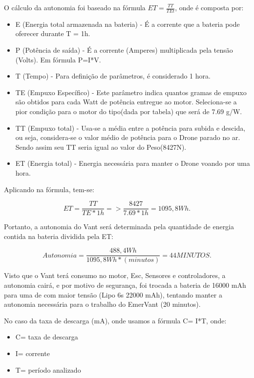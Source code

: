 O cálculo da autonomia foi baseado na fórmula $ET=\frac{TT}{TEt}$, onde é composta por:

\begin{itemize}
\item E (Energia total armazenada na bateria) - É a corrente que a bateria pode oferecer durante T = 1h.
\item P (Potência de saída) - É a corrente (Amperes) multiplicada pela tensão (Volts). Em fórmula P=I*V.
\item T (Tempo) - Para definição de parâmetros, é considerado 1 hora.
\item TE (Empuxo Específico) - Este parâmetro indica quantos gramas de empuxo são obtidos para cada Watt de potência entregue ao motor. Seleciona-se a pior condição para o motor do tipo(dada por tabela) que será de 7.69 g/W.
\item TT (Empuxo total) - Usa-se a média entre a potência para subida e descida, ou seja, considera-se o valor médio de potência para o Drone parado no ar. Sendo assim seu TT seria igual ao valor do Peso(8427N).  
\item ET (Energia total) - Energia necessária para manter o Drone voando por uma hora. 
\end{itemize}

Aplicando na fórmula, tem-se:

\begin{equation}
ET=\frac{TT}{TE*1h} => \frac{8427}{7.69*1h} = 1095,8 Wh.
\end{equation}

Portanto, a autonomia do Vant será determinada pela quantidade de energia contida na bateria dividida pela ET:

\begin{equation}
Autonomia = \frac{488,4Wh}{1095,8Wh *(minutos)} = 44 MINUTOS.
\end{equation}

Visto que o Vant terá consumo no motor, Esc, Sensores e controladores, a autonomia cairá, e por motivo de segurança, foi trocada a bateria de 16000 mAh para uma de com maior  tensão (Lipo 6s 22000 mAh), tentando manter a autonomia necessária para o trabalho do EmerVant (20 minutos). 

No caso da taxa de descarga (mA), onde usamos a fórmula C= I*T, onde:

\begin{itemize}
	\item C= taxa de descarga
	\item I= corrente
	\item T= período analizado
\end{itemize}

